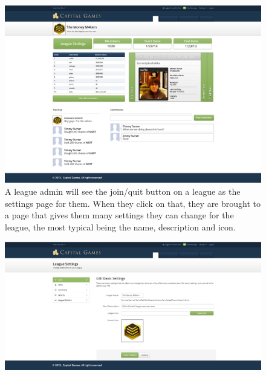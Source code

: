 \begin{figure}
\centering
\includegraphics[width=5.5in]{./mockups/JPEG/Leaguesadmin.jpg}
\caption{A league admin will see the join/quit button on a league as the settings page for them. When they click on that, they are brought to a page that gives them many settings they can change for the league, the most typical being the name, description and icon.}
\end{figure}

\begin{figure}
\centering
\includegraphics[width=5.5in]{./mockups/JPEG/leagueadmin.jpg}
\end{figure}



